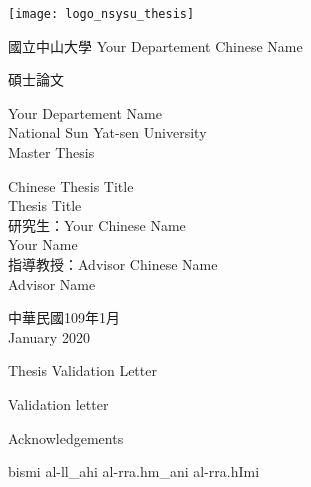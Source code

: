\documentclass[12pt, twoside , openright]{book}
\begin{document}
\thispagestyle{empty}
\begin{center}
	\onehalfspacing
	\texttt{[image: logo\_nsysu\_thesis]}
	
	{\chinnesesize 國立中山大學 Your Departement Chinese Name %
		
		碩士論文} %
	
	{\bigsize Your Departement Name\\National Sun Yat-sen University\\}
	{\bigsize Master Thesis\\}
	
	\vspace{2cm}
	{\chinnesesize Chinese Thesis Title\\}
	{\bigsize Thesis Title\\}
	\vspace{2cm}
	{\bigsize 研究生：Your Chinese Name\\
		\hspace{70pt} Your Name\\
		指導教授：Advisor Chinese Name\\
		\hspace{130pt}Advisor Name \\
	}
	
	\vspace{1.5cm}
	
	{\bigsize 中華民國109年1月\\
		January 2020\\
		
	}
\end{center}

\newpage
\mbox{}
\thispagestyle{empty}
\newpage
{}


\begin{center}
	{\chinnesesize Thesis Validation Letter }
\end{center}
Validation letter
\newpage
\mbox{}
\newpage


\begin{center}
	{\chinnesesize Acknowledgements}
\end{center}
\setarab
\fullvocalize
\arabtrue
\begin{center}
	\begin{RLtext}
		bismi al-ll_ahi al-rra.hm_ani al-rra.hImi
	\end{RLtext}
\end{center}
\end{document}
